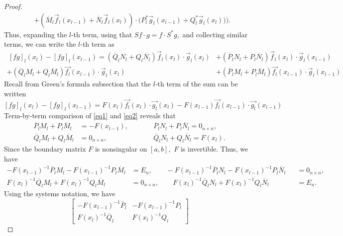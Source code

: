 \documentclass[11pt,reqno,oneside,a4paper]{article}
\theoremstyle{plain} %
\theoremstyle{definition}
\theoremstyle{remark}
\begin{document}
\begin{proof}
\begin{align*}
&+ \left( \overline{M}_l \vec{f}_l(x_{l-1}) + \overline{N}_l  \vec{f}_l(x_l) \right) \cdot \Big( P^*_l \vec{g}_l(x_{l-1}) + Q^*_l \vec{g}_l(x_l) \Big) \Bigg).
\end{align*}
Thus, expanding the $l$-th term, using that $S f \cdot g = f \cdot S^* g,$ and collecting similar terms, we can write the $l$-th term as
\begin{equation}\label{eq1}
\begin{aligned}
~[fg]_l(x_l) - [fg]_l(x_{l-1}) = (\overline{Q}_l N_l + Q_l \overline{N}_l)  \vec{f}_l(x_l)  \cdot  \vec{g}_l(x_l) &+  (\overline{P}_l N_l  + P_l\overline{N}_l ) \vec{f}_l(x_l)  \cdot  \vec{g}_l(x_{l-1}) \\
+   (\overline{Q}_l  M_l +Q_l \overline{M}_l) \vec{f_l}(x_{l-1}) \cdot\vec{g}_l(x_l) &+  (\overline{P}_l M_l+P_l \overline{M}_l) \vec{f_l}(x_{l-1}) \cdot  \vec{g}_l(x_{l-1}) 
\end{aligned}
\end{equation}
Recall from Green's formula subsection that the $l$-th term of the sum can be written
\begin{equation}\label{eq2}
[fg]_l(x_l) - [fg]_l(x_{l-1}) = F(x_l) \vec{f_l}(x_l) \cdot \vec{g_l}(x_l) - F(x_{l-1}) \vec{f_l}(x_{l-1}) \cdot \vec{g_l}(x_{l-1}) 
\end{equation}
Term-by-term comparison of \eqref{eq1} and \eqref{eq2} reveals that 
\begin{align*}
\overline{P}_l M_l+P_l \overline{M}_l &= - F(x_{l-1}), \qquad &&\overline{P}_l N_l  + P_l\overline{N}_l = 0_{n\times n}, \\
\overline{Q}_l  M_l +Q_l \overline{M}_l &= 0_{n\times n},  \qquad &&\overline{Q}_l N_l + Q_l \overline{N}_l = F(x_l).
\end{align*}
Since the boundary matrix $F$ is nonsingular on $[a,b],$ $F$ is invertible. Thus, we have 
\begin{align*}
- F(x_{l-1})^{-1} \overline{P}_l M_l - F(x_{l-1})^{-1} P_l \overline{M}_l &= E_n, \qquad -F(x_{l-1})^{-1}\overline{P}_l N_l  - F(x_{l-1})^{-1} P_l\overline{N}_l &&= 0_{n\times n}, \\
F(x_l)^{-1}\overline{Q}_l  M_l +F(x_l)^{-1}Q_l \overline{M}_l &= 0_{n\times n},  \qquad F(x_l)^{-1}\overline{Q}_l N_l + F(x_l)^{-1} Q_l \overline{N}_l &&= E_n.
\end{align*}
Using the systems notation, we have 
\[ 
\begin{bmatrix}
- F(x_{l-1})^{-1} \overline{P}_l & - F(x_{l-1})^{-1} P_l \\
F(x_l)^{-1}\overline{Q}_l & F(x_l)^{-1}Q_l 

\end{bmatrix}\]
\end{proof}
\end{document}
